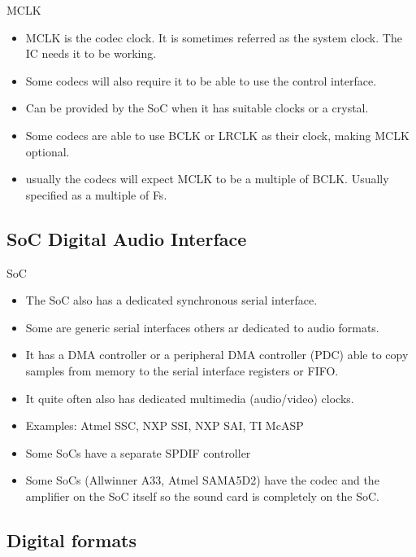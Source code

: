 \begin{frame}{MCLK}
  \begin{itemize}
  \item MCLK is the codec clock. It is sometimes referred as the
    system clock. The IC needs it to be working.
  \item Some codecs will also require it to be able to use the
    control interface.
  \item Can be provided by the SoC when it has suitable clocks or a
    crystal.
  \item Some codecs are able to use BCLK or LRCLK as their clock,
    making MCLK optional.
  \item usually the codecs will expect MCLK to be a multiple of BCLK.
    Usually specified as a multiple of Fs.
  \end{itemize}
\end{frame}

\subsection{SoC Digital Audio Interface}

\begin{frame}{SoC}
  \begin{itemize}
  \item The SoC also has a dedicated synchronous serial interface.
  \item Some are generic serial interfaces others ar dedicated to audio
    formats.
  \item It has a DMA controller or a peripheral DMA controller (PDC)
    able to copy samples from memory to the serial interface registers
    or FIFO.
  \item It quite often also has dedicated multimedia (audio/video) clocks.
  \item Examples: Atmel SSC, NXP SSI, NXP SAI, TI McASP
  \item Some SoCs have a separate SPDIF controller
  \item Some SoCs (Allwinner A33, Atmel SAMA5D2) have the codec and
    the amplifier on the SoC itself so the sound card is completely on
    the SoC.
  \end{itemize}
\end{frame}

\subsection{Digital formats}

